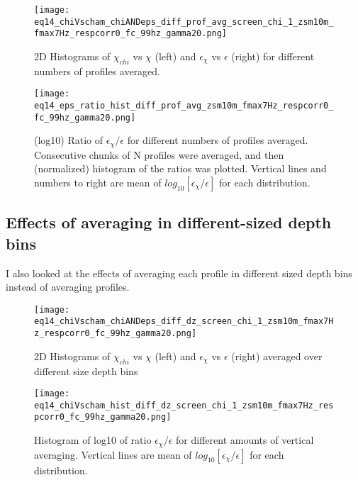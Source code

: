 \documentclass[11pt]{article}
\begin{document}
\begin{figure}[htbp]
\texttt{[image: eq14\_chiVscham\_chiANDeps\_diff\_prof\_avg\_screen\_chi\_1\_zsm10m\_fmax7Hz\_respcorr0\_fc\_99hz\_gamma20.png]}
\caption{2D Histograms of $\chi_{chi}$ vs $\chi$ (left) and $\epsilon_{\chi}$ vs $\epsilon$ (right) for different numbers of profiles averaged.}
\label{}
\end{figure}


\begin{figure}[htbp]
\texttt{[image: eq14\_eps\_ratio\_hist\_diff\_prof\_avg\_zsm10m\_fmax7Hz\_respcorr0\_fc\_99hz\_gamma20.png]}
\caption{(log10) Ratio of $\epsilon_{\chi}/\epsilon$ for different numbers of profiles averaged. Consecutive chunks of N profiles were averaged, and then (normalized) histogram of the ratios was plotted. Vertical lines and numbers to right are mean of $log_{10}[\epsilon_{\chi}/\epsilon]$ for each distribution. }
\label{}
\end{figure}




\clearpage
\subsection{Effects of averaging in different-sized depth bins}

I also looked at the effects of averaging each profile in different sized depth bins instead of averaging profiles.


\begin{figure}[htbp]
\texttt{[image: eq14\_chiVscham\_chiANDeps\_diff\_dz\_screen\_chi\_1\_zsm10m\_fmax7Hz\_respcorr0\_fc\_99hz\_gamma20.png]}
\caption{2D Histograms of $\chi_{chi}$ vs $\chi$ (left) and $\epsilon_{\chi}$ vs $\epsilon$ (right) averaged over different size depth bins}
\label{}
\end{figure}



\begin{figure}[htbp]
\texttt{[image: eq14\_chiVscham\_hist\_diff\_dz\_screen\_chi\_1\_zsm10m\_fmax7Hz\_respcorr0\_fc\_99hz\_gamma20.png]}
\caption{Histogram of log10 of ratio $\epsilon_{\chi}/\epsilon$ for different amounts of vertical averaging. Vertical lines are mean of $log_{10}[\epsilon_{\chi}/\epsilon]$ for each distribution.}
\label{}
\end{figure}
\end{document}
